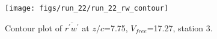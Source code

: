 \begin{figure}[H]
\centering
\texttt{[image: figs/run\_22/run\_22\_rw\_contour]}
\caption{Contour plot of $\overline{r^\prime w^\prime}$ at $z/c$=7.75, $V_{free}$=17.27, station 3.}
\label{fig:run_22_rw_contour}
\end{figure}


